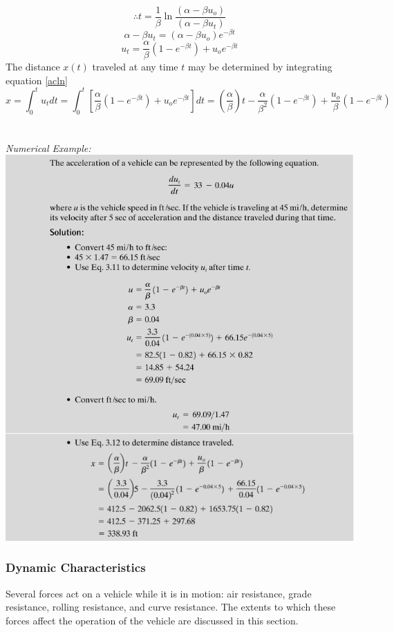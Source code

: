 \begin{equation}
	\therefore t = \frac{1}{\beta}\ln\frac{(\alpha - \beta u_o)}{(\alpha - \beta u_t)}
\end{equation}
\begin{equation*}
	\alpha - \beta u_t = (\alpha - \beta u_o) e^{-\beta t}
\end{equation*}
\begin{equation}
	\label{acln}
	u_t = \frac{\alpha}{\beta} (1 - e^{-\beta t}) + u_o e^{-\beta t}
\end{equation}
The distance $x(t)$ traveled at any time $t$ may be determined by integrating equation \ref{acln}
\begin{equation}
	x = \int_0^t u_t dt = \int_0^t \left[\frac{\alpha}{\beta} (1 - e^{-\beta t}) + u_o e^{-\beta t} \right] dt
	= \left(\frac{\alpha}{\beta}\right)t - \frac{\alpha}{\beta^2}(1 - e^{-\beta t}) + \frac{u_o}{\beta}(1 - e^{-\beta t})
\end{equation}\\\\
\emph{Numerical Example:}\\
\includegraphics[scale=0.5]{gfx/fig7.png}
\subsubsection{Dynamic Characteristics}
Several forces act on a vehicle while it is in motion: air resistance, grade resistance, rolling resistance, and curve resistance. The extents to which these forces affect the operation of the vehicle are discussed in this section.
